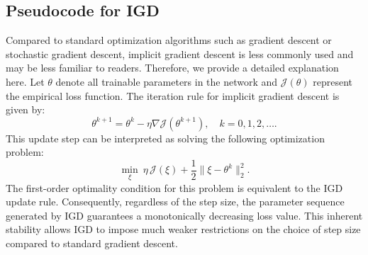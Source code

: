 \documentclass{article}
\begin{document}
\subsection{Pseudocode for IGD}\label{sec:IGD PINN}
Compared to standard optimization algorithms such as gradient descent or stochastic gradient descent, implicit gradient descent is less commonly used and may be less familiar to readers. 
Therefore, we provide a detailed explanation here. 
Let $\theta$ denote all trainable parameters in the network and $\mathcal{J}(\theta)$ represent the empirical loss function.
The iteration rule for implicit gradient descent is given by:
\begin{equation*}
    \theta^{k+1} = \theta^k - \eta \nabla \mathcal{J}(\theta^{k+1}), \quad k=0,1,2,\ldots .
\end{equation*}
This update step can be interpreted as solving the following optimization problem:
\begin{equation}
    \min_{\xi}\ \eta\, \mathcal{J}(\xi) + \frac{1}{2} \|\xi - \theta^k\|_2^2.\label{eq:igd subproblem}
\end{equation}
The first-order optimality condition for this problem is equivalent to the IGD update rule.  
Consequently, regardless of the step size, the parameter sequence generated by IGD guarantees a monotonically decreasing loss value.  
This inherent stability allows IGD to impose much weaker restrictions on the choice of step size compared to standard gradient descent.
\end{document}
